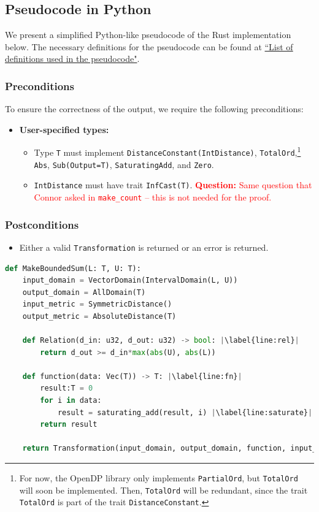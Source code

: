 \documentclass[11pt,a4paper]{article}
\theoremstyle{definition}
\newcommand{\questionc}[1]{\textcolor{red}{\textbf{Question:} #1}}
\begin{document}
\subsection{Pseudocode in Python}
We present a simplified Python-like pseudocode of the Rust implementation below. The necessary definitions for the pseudocode can be found at \href{https://www.overleaf.com/project/60d215bf90b337ac02200a99}{``List of definitions used in the pseudocode"}.

\subsubsection*{Preconditions}
To ensure the correctness of the output, we require the following preconditions:

\begin{itemize}
    \item \textbf{User-specified types:}
    \begin{itemize}
        \item Type \texttt{T} must implement \texttt{DistanceConstant(IntDistance)}, \texttt{TotalOrd},\footnote{For now, the OpenDP library only implements \texttt{PartialOrd}, but \texttt{TotalOrd} will soon be implemented. Then, \texttt{TotalOrd} will be redundant, since the trait \texttt{TotalOrd} is part of the trait \texttt{DistanceConstant}.} \texttt{Abs}, \texttt{Sub(Output=T)}, \texttt{SaturatingAdd}, and \texttt{Zero}.
        \item \texttt{IntDistance} must have trait \texttt{InfCast(T)}. \questionc{Same question that Connor asked in \texttt{make\_count} -- this is not needed for the proof.}
\end{itemize}
\end{itemize}

\subsubsection*{Postconditions}
\begin{itemize}
    \item Either a valid \texttt{Transformation} is returned or an error is returned.
\end{itemize}

\begin{lstlisting}[language=Python, escapechar=|]
def MakeBoundedSum(L: T, U: T):
    input_domain = VectorDomain(IntervalDomain(L, U))
    output_domain = AllDomain(T)
    input_metric = SymmetricDistance()
    output_metric = AbsoluteDistance(T)
    
    def Relation(d_in: u32, d_out: u32) -> bool: |\label{line:rel}|
        return d_out >= d_in*max(abs(U), abs(L))
    
    def function(data: Vec(T)) -> T: |\label{line:fn}|
        result:T = 0
        for i in data:
            result = saturating_add(result, i) |\label{line:saturate}|
        return result
        
    return Transformation(input_domain, output_domain, function, input_metric, output_metric, stability_relation = Relation)
\end{lstlisting}
\end{document}
